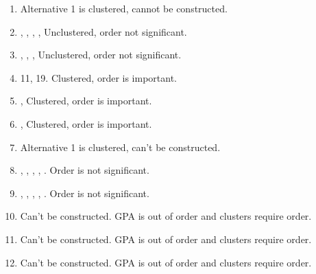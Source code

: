

\usepackage{enumitem}



\homeworkheader{\classnameandsection}

\begin{problem}{8.4}
  \begin{solution}
    \begin{enumerate}
      \item Alternative 1 is clustered, cannot be constructed.\\
      \item
        ,
        ,
        ,
        ,
      Unclustered, order not significant.\\
      \item
        ,
        ,
        ,
      Unclustered, order not significant.\\
      \item 11, 19. Clustered, order is important.\\
      \item
        ,   Clustered, order is important.\\
      \item
        ,   Clustered, order is important.\\
      \item Alternative 1 is clustered, can't be constructed. \\
      \item
        ,
        ,
        ,
        ,
        .
        Order is not significant.\\
      \item
        ,
        ,
        ,
        ,
        .
        Order is not significant.\\
      \item Can't be constructed. GPA is out of order and clusters require order.\\
      \item Can't be constructed. GPA is out of order and clusters require order.\\
      \item Can't be constructed. GPA is out of order and clusters require order.
    \end{enumerate}
  \end{solution}
\end{problem}

